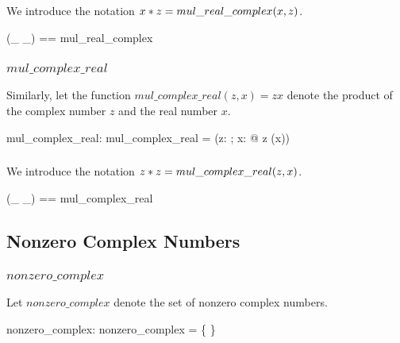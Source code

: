 \documentclass{amsart}
\begin{document}
\subsubsection{}

We introduce the notation $x \mathbin{*} z = mul\_real\_complex(x, z)$.

\begin{zed}
	(\_ \mulRC \_) == mul\_real\_complex
\end{zed}

\subsubsection{$mul\_complex\_real$}

Similarly, let the function $mul\_complex\_real(z, x) = zx$ denote the product of the complex number $z$ and
the real number $x$.

\begin{axdef}
	mul\_complex\_real: \C \cross \R \fun \C
\where
	mul\_complex\_real = (\lambda z: \C; x: \R @ z \mulC (\asRC x))
\end{axdef}

\subsubsection{}

We introduce the notation $z \mathbin{*} z = mul\_complex\_real(z, x)$.

\begin{zed}
	(\_ \mulCR \_) == mul\_complex\_real
\end{zed}

\subsection{Nonzero Complex Numbers}

\subsubsection{$nonzero\_complex$}

Let $nonzero\_complex$ denote the set of nonzero complex numbers.

\begin{axdef}
	nonzero\_complex: \power \C
\where
	nonzero\_complex = \C \setminus \{ \zeroC \}
\end{axdef}

\subsubsection{}
\end{document}
